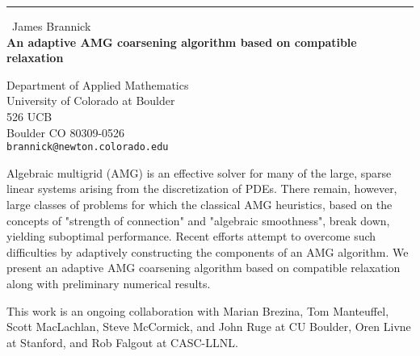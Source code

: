 \documentclass{report}
\begin{document}
\begin{center}
\rule{6in}{1pt} \
{\large James Brannick \\
{\bf An adaptive AMG coarsening algorithm based on compatible relaxation}}

Department of Applied Mathematics \\ University of Colorado at Boulder  \\ 526 UCB \\ Boulder CO 80309-0526
\\
{\tt brannick@newton.colorado.edu}\end{center}

Algebraic multigrid (AMG) is an effective solver for many of the large,
sparse linear systems arising from the discretization of PDEs. There
remain, however, large classes of problems for which the classical AMG
heuristics, based on the concepts of "strength of connection" and
"algebraic smoothness", break down, yielding suboptimal performance.
Recent efforts attempt to overcome such difficulties by adaptively
constructing the components of an AMG algorithm. We present an adaptive
AMG coarsening algorithm based on compatible relaxation along with
preliminary numerical results.

This work is an ongoing collaboration with Marian Brezina, Tom
Manteuffel, Scott MacLachlan, Steve McCormick, and John Ruge at CU
Boulder, Oren Livne at Stanford, and Rob Falgout at CASC-LLNL.
\end{document}

